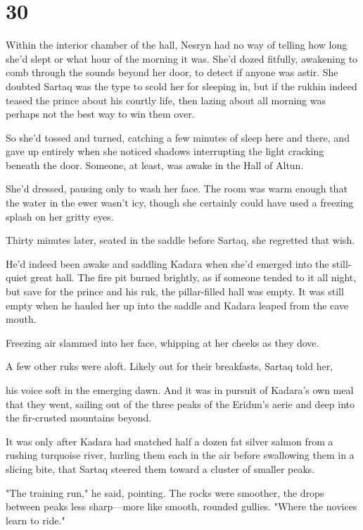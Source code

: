 
\chapter{30}

Within the interior chamber of the hall, Nesryn had no way of telling how long she'd slept or what hour of the morning it was.
She'd dozed fitfully, awakening to comb through the sounds beyond her door, to detect if anyone was astir.
She doubted Sartaq was the type to scold her for sleeping in, but if the rukhin indeed teased the prince about his courtly life, then lazing about all morning was perhaps not the best way to win them over.

So she'd tossed and turned, catching a few minutes of sleep here and there, and gave up entirely when she noticed shadows interrupting the light cracking beneath the door.
Someone, at least, was awake in the Hall of Altun.

She'd dressed, pausing only to wash her face.
The room was warm enough that the water in the ewer wasn't icy, though she certainly could have used a freezing splash on her gritty eyes.

Thirty minutes later, seated in the saddle before Sartaq, she regretted that wish.

He'd indeed been awake and saddling Kadara when she'd emerged into the still-quiet great hall.
The fire pit burned brightly, as if someone tended to it all night, but save for the prince and his ruk, the pillar-filled hall was empty.
It was still empty when he hauled her up into the saddle and Kadara leaped from the cave mouth.

Freezing air slammed into her face, whipping at her cheeks as they dove.

A few other ruks were aloft.
Likely out for their breakfasts, Sartaq told her,

his voice soft in the emerging dawn.
And it was in pursuit of Kadara's own meal that they went, sailing out of the three peaks of the Eridun's aerie and deep into the fir-crusted mountains beyond.

It was only after Kadara had snatched half a dozen fat silver salmon from a rushing turquoise river, hurling them each in the air before swallowing them in a slicing bite, that Sartaq steered them toward a cluster of smaller peaks.

"The training run," he said, pointing.
The rocks were smoother, the drops between peaks less sharp---more like smooth, rounded gullies.
"Where the novices learn to ride."

